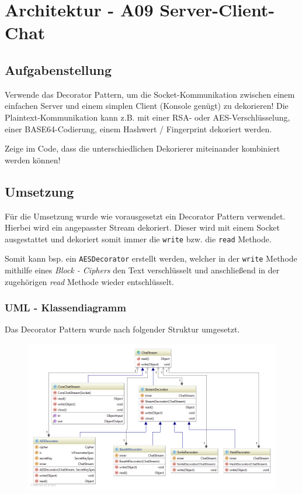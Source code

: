 \section{Architektur - A09 Server-Client-Chat}
	\subsection{Aufgabenstellung}
	Verwende das Decorator Pattern, um die Socket-Kommunikation zwischen einem einfachen Server und einem simplen Client (Konsole genügt) zu dekorieren! Die Plaintext-Kommunikation kann z.B. mit einer RSA- oder AES-Verschlüsselung, einer BASE64-Codierung, einem Hashwert / Fingerprint dekoriert werden.
	
	Zeige im Code, dass die unterschiedlichen Dekorierer miteinander kombiniert werden können!
	
	\subsection{Umsetzung}
	Für die Umsetzung wurde wie vorausgesetzt ein Decorator Pattern verwendet.
	Hierbei wird ein angepasster Stream dekoriert. Dieser wird mit einem Socket ausgestattet und dekoriert somit immer die \texttt{write} bzw. die \texttt{read} Methode.
	
	Somit kann bsp. ein \texttt{AESDecorator} erstellt werden, welcher in der \texttt{write} Methode mithilfe eines \textit{Block - Ciphers} den Text verschlüsselt und anschließend in der zugehörigen \textit{read} Methode wieder entschlüsselt.
	
		\subsubsection{UML - Klassendiagramm}
		Das Decorator Pattern wurde nach folgender Struktur umgesetzt.
		\vspace{0.2cm}
		\begin{figure}[!h]
			\begin{center}
				\includegraphics[width=0.76\linewidth]{images/decdiagram.png}
			\end{center}
		\end{figure}
		
